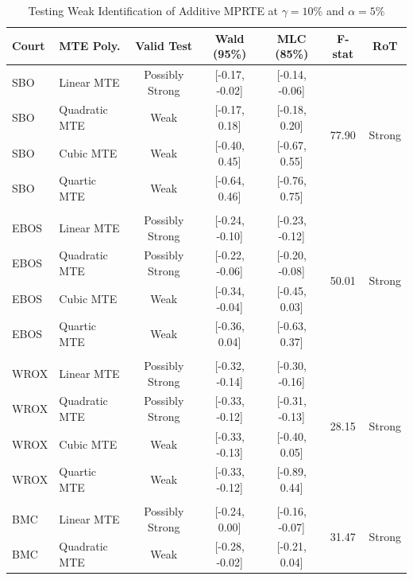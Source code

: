 \documentclass[11pt]{article}
\theoremstyle{definition}
\newcommand{\0}{\ensuremath{\mathbf{0}}}
\begin{document}
\begin{bibunit}
%
\begin{table}[htbp]
  \centering
  \caption{Testing Weak Identification of Additive MPRTE at $\gamma = 10\%$ and $\alpha = 5\%$}
  \begin{threeparttable}
    \begin{tabular}{llccccc}
    \toprule
    Court & MTE Poly. & Valid Test & Wald (95\%) & MLC (85\%) & F-stat & RoT \\
    \midrule
    SBO   & Linear MTE & Possibly Strong & [-0.17, -0.02] & [-0.14, -0.06] & \multirow{4}[1]{*}{77.90} & \multirow{4}[1]{*}{Strong} \\
    SBO   & Quadratic MTE & Weak  & [-0.17, 0.18] & [-0.18, 0.20] &       &  \\
    SBO   & Cubic MTE & Weak  & [-0.40, 0.45] & [-0.67, 0.55] &       &  \\
    SBO   & Quartic MTE & Weak  & [-0.64, 0.46] & [-0.76, 0.75] &       &  \\
          &       &       &       &       &       &  \\
    EBOS  & Linear MTE & Possibly Strong & [-0.24, -0.10] & [-0.23, -0.12] & \multirow{4}[0]{*}{50.01} & \multirow{4}[0]{*}{Strong} \\
    EBOS  & Quadratic MTE & Possibly Strong & [-0.22, -0.06] & [-0.20, -0.08] &       &  \\
    EBOS  & Cubic MTE & Weak  & [-0.34, -0.04] & [-0.45, 0.03] &       &  \\
    EBOS  & Quartic MTE & Weak  & [-0.36, 0.04] & [-0.63, 0.37] &       &  \\
          &       &       &       &       &       &  \\
    WROX  & Linear MTE & Possibly Strong & [-0.32, -0.14] & [-0.30, -0.16] & \multirow{4}[0]{*}{28.15} & \multirow{4}[0]{*}{Strong} \\
    WROX  & Quadratic MTE & Possibly Strong & [-0.33, -0.12] & [-0.31, -0.13] &       &  \\
    WROX  & Cubic MTE & Weak  & [-0.33, -0.13] & [-0.40, 0.05] &       &  \\
    WROX  & Quartic MTE & Weak  & [-0.33, -0.12] & [-0.89, 0.44] &       &  \\
          &       &       &       &       & \textcolor[rgb]{ 0,  .114,  .784}{} &  \\
    BMC   & Linear MTE & Possibly Strong & [-0.24, 0.00] & [-0.16, -0.07] & \multirow{4}[0]{*}{31.47} & \multirow{4}[0]{*}{Strong} \\
    BMC   & Quadratic MTE & Weak  & [-0.28, -0.02] & [-0.21, 0.04] &       &  \\

\end{tabular}
\end{threeparttable}
\end{table}
\end{bibunit}
\end{document}
